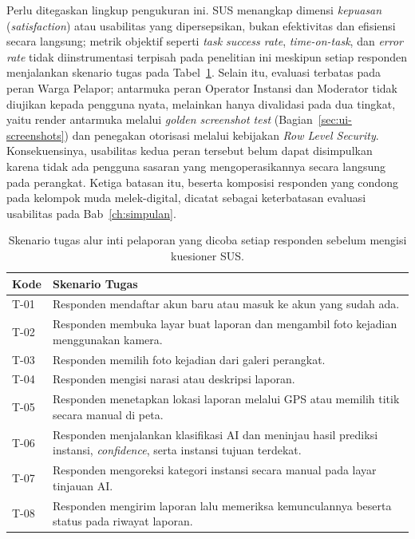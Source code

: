Perlu ditegaskan lingkup pengukuran ini. SUS menangkap dimensi \textit{kepuasan} (\textit{satisfaction}) atau usabilitas yang dipersepsikan, bukan efektivitas dan efisiensi secara langsung; metrik objektif seperti \textit{task success rate}, \textit{time-on-task}, dan \textit{error rate} tidak diinstrumentasi terpisah pada penelitian ini meskipun setiap responden menjalankan skenario tugas pada Tabel~\ref{tab:skenario-usabilitas}. Selain itu, evaluasi terbatas pada peran Warga Pelapor; antarmuka peran Operator Instansi dan Moderator tidak diujikan kepada pengguna nyata, melainkan hanya divalidasi pada dua tingkat, yaitu render antarmuka melalui \textit{golden screenshot test} (Bagian~\ref{sec:ui-screenshots}) dan penegakan otorisasi melalui kebijakan \textit{Row Level Security}. Konsekuensinya, usabilitas kedua peran tersebut belum dapat disimpulkan karena tidak ada pengguna sasaran yang mengoperasikannya secara langsung pada perangkat. Ketiga batasan itu, beserta komposisi responden yang condong pada kelompok muda melek-digital, dicatat sebagai keterbatasan evaluasi usabilitas pada Bab~\ref{ch:simpulan}.

\begin{table}[htbp]
\centering
\small
\caption{Skenario tugas alur inti pelaporan yang dicoba setiap responden sebelum mengisi kuesioner SUS.}
\label{tab:skenario-usabilitas}
\begin{tabular}{p{1.4cm} p{10cm}}
\toprule
\textbf{Kode} & \textbf{Skenario Tugas} \\
\midrule
T-01 & Responden mendaftar akun baru atau masuk ke akun yang sudah ada. \\
T-02 & Responden membuka layar buat laporan dan mengambil foto kejadian menggunakan kamera. \\
T-03 & Responden memilih foto kejadian dari galeri perangkat. \\
T-04 & Responden mengisi narasi atau deskripsi laporan. \\
T-05 & Responden menetapkan lokasi laporan melalui GPS atau memilih titik secara manual di peta. \\
T-06 & Responden menjalankan klasifikasi AI dan meninjau hasil prediksi instansi, \textit{confidence}, serta instansi tujuan terdekat. \\
T-07 & Responden mengoreksi kategori instansi secara manual pada layar tinjauan AI. \\
T-08 & Responden mengirim laporan lalu memeriksa kemunculannya beserta status pada riwayat laporan. \\
\bottomrule
\end{tabular}
\end{table}

